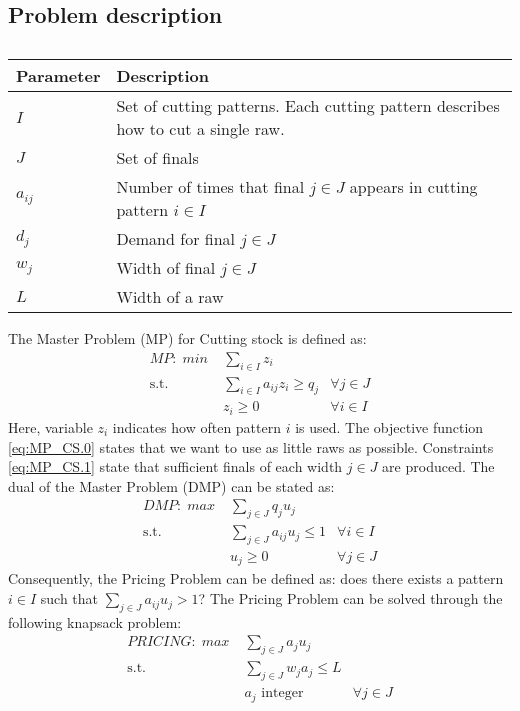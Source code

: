 \documentclass[a4paper]{article}
\begin{document}
\subsection{Problem description}
\begin{table}[ht]
\begin{tabular}{ll}
\toprule
\textbf{Parameter} 	& \textbf{Description}\\
\midrule
$I$		& Set of cutting patterns. Each cutting pattern describes how to cut a single raw.\\
$J$		& Set of finals\\
$a_{ij}$		& Number of times that final $j\in J$ appears in cutting pattern $i\in I$\\
$d_j$		& Demand for final $j\in J$\\
$w_j$		& Width of final $j\in J$\\
$L$		& Width of a raw\\
\bottomrule
\end{tabular}
\caption{}
\label{tbl:cutting_stock} 
\end{table}

The Master Problem (MP) for Cutting stock is defined as:
\begin{align}
\label{eq:MP_CS.0} \mathit{MP:}\; min\; &\sum_{i\in I} z_i &\\
\label{eq:MP_CS.1} \mbox{s.t. }&\sum_{i \in I} a_{ij}z_i\geq q_j & \forall j\in J\\
\label{eq:MP_CS.2} &z_i\geq 0 &\forall i \in I
\end{align}
Here, variable $z_i$ indicates how often pattern $i$ is used. The objective function \eqref{eq:MP_CS.0} states that we want to use as little raws as possible. Constraints \eqref{eq:MP_CS.1} state that sufficient finals of each width $j\in J$ are produced. The dual of the Master Problem (DMP) can be stated as:
\begin{align}
\label{eq:DMP_CS.0} \mathit{DMP:}\; max\; &\sum_{j\in J} q_ju_j &\\
\label{eq:DMP_CS.1} \mbox{s.t. }&\sum_{j\in J} a_{ij}u_j\leq 1 & \forall i\in I\\
\label{eq:DMP_CS.2} &u_j\geq 0 &\forall j\in J
\end{align}
Consequently, the Pricing Problem can be defined as: does there exists a pattern $i\in I$ such that $\sum_{j\in J}a_{ij}u_j>1$? The Pricing Problem can be solved through the following knapsack problem:
\begin{align}
\label{eq:PRICE_CS.0} \mathit{PRICING:}\; max\; &\sum_{j\in J} a_ju_j &\\
\label{eq:PRICE_CS.1} \mbox{s.t. }&\sum_{j\in J} w_ja_j\leq L & \\
\label{eq:PRICE_CS.2} &a_j\mbox{ integer} &\forall j\in J
\end{align}
\end{document}
